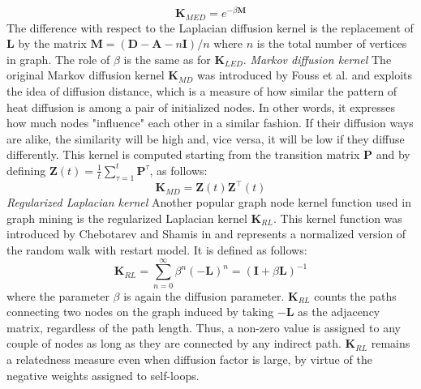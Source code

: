 \documentclass{article}
\begin{document}
\begin{equation} \label{MEDK-formula}
\textbf{K}_{MED} = e^{-\beta \textbf{M}}
\end{equation}
The difference with respect to the Laplacian diffusion kernel is the replacement of $\textbf{L}$ by the matrix $\textbf{M}=(\textbf{D}-\textbf{A}-n\textbf{I})/n$ where $n$ is the total number of vertices in graph. The role of $\beta$ is the same as for $\textbf{K}_{LED}$. \newline \newline
\textit{Markov diffusion kernel} \newline
The original Markov diffusion kernel $\textbf{K}_{MD}$ was introduced by Fouss et al. \cite{mdk} and exploits the idea of diffusion distance, which is a measure of how similar the pattern of heat diffusion is among a pair of initialized nodes. In other words, it expresses how much nodes "influence" each other in a similar fashion. If their diffusion ways are alike, the similarity will be high and, vice versa, it will be low if they diffuse differently. This kernel is computed starting from the transition matrix $\textbf{P}$ and by defining $\textbf{Z}(t) = \frac{1}{t}\sum_{\tau=1}^{t}\textbf{P}^{\tau}$, as follows:
\begin{equation} \label{MDK-formula}
\textbf{K}_{MD} = \textbf{Z}(t)\textbf{Z}^{\top}(t)
\end{equation}
\newline \newline
\textit{Regularized Laplacian kernel} \newline
Another popular graph node kernel function used in graph mining is the regularized Laplacian kernel $\textbf{K}_{RL}$. This kernel function was introduced by Chebotarev and Shamis in \cite{rlk} and represents a normalized version of the random walk with restart model. It is defined as follows:
\begin{equation} \label{RLK-formula}
\textbf{K}_{RL} = \sum_{n=0}^{\infty}\beta^{n}(-\textbf{L})^n = (\textbf{I} + \beta \textbf{L})^{-1}
\end{equation}
where the parameter $\beta$ is again the diffusion parameter. $\textbf{K}_{RL}$ counts the paths connecting two nodes on the graph induced by taking $-\textbf{L}$ as the adjacency matrix, regardless of the path length. Thus, a non-zero value is assigned to any couple of nodes as long as they are connected by any indirect path. $\textbf{K}_{RL}$ remains a relatedness measure even when diffusion factor is large, by virtue of the negative weights assigned to self-loops.
\end{document}
